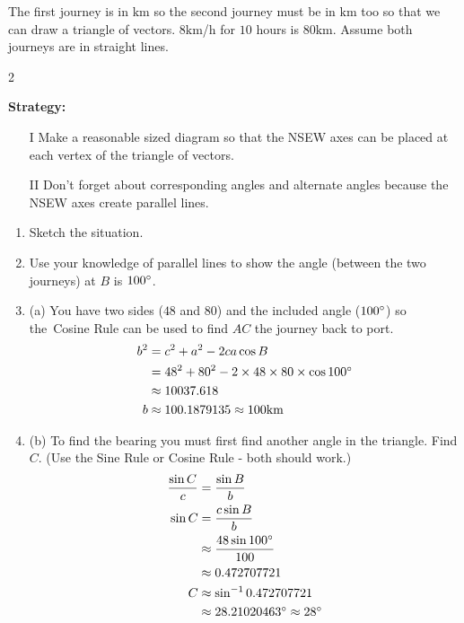 The first journey is in $\mbox{km}$ so the second journey must be in $\mbox{km}$ too so that we can draw a triangle of vectors. $8 \mbox{km}$/$\mbox{h}$ for $10$ hours is $80 \mbox{km}$. Assume both journeys are in straight lines. 
\columnsep =30pt
\begin {multicols}{2}

\textbf{Strategy:}
\begin{enumerate}
\item [I] Make a reasonable sized diagram so that the NSEW axes can be placed at each
vertex of the triangle of vectors. 

\item [II] Don't forget about corresponding
angles and alternate angles because the NSEW axes create parallel lines. \end{enumerate}
    
\setlength\fboxrule{0in}\setlength\fboxsep{0.2in}

\begin{enumerate}
\item Sketch the situation. 

\item Use your knowledge of parallel
lines to show the angle (between the two journeys) at $B$ is $100 \mbox{{\ensuremath{{}^\circ}}}$. 

\item (a) You have two sides ($48$ and $80$) and the included angle ($100 \mbox{{\ensuremath{{}^\circ}}}$) so the\ Cosine Rule can be used to find $A C$ the journey back to port.
\begin{align*}b^{2} &  = c^{2} +a^{2} -2 c a \cos  B \\
 &  = 48^{2} +80^{2} -2 \times 48 \times 80 \times \cos  100 \mbox{{\ensuremath{{}^\circ}}} \\
 &  \approx   10037.618 \\
b &  \approx   100.1879135 \approx 100 \mbox{km}\end{align*}

\item (b) To find the bearing you must first find another angle
in the triangle. Find $C$. (Use the Sine Rule or Cosine Rule - both should work.)
\begin{align*}\frac{\sin  C}{c} &  = \frac{\sin  B}{b} \\
\sin  C &  = \frac{c \sin  B}{b} \\
 &  \approx   \frac{48 \sin  100 \mbox{{\ensuremath{{}^\circ}}}}{100} \\
 &  \approx   0.472707721 \\
C &  \approx   \sin ^{ -1} 0.472707721 \\
 &  \approx   28.21020463 \mbox{{\ensuremath{{}^\circ}}} \approx 28 \mbox{{\ensuremath{{}^\circ}}}\end{align*}\end{enumerate}



\end {multicols}


